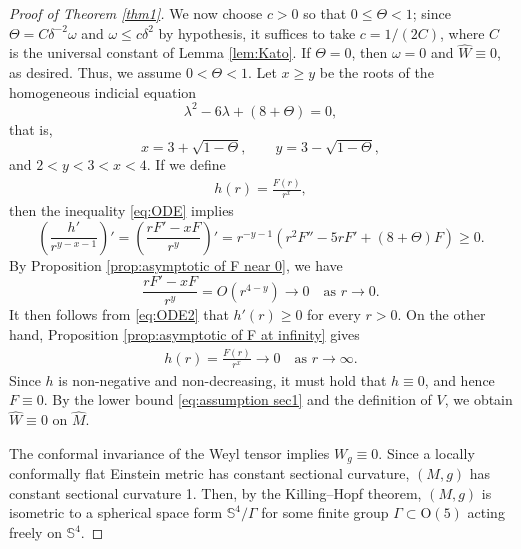\documentclass[11pt]{amsart}
\theoremstyle{plain}
\numberwithin{equation}{section}
\renewcommand{\S}{\mathbb{S}}
\newcommand{\wh}[1]{\widehat{#1}}
\newcommand{\hw}{\widehat{W}}
\newcommand{\hm}{\widehat{M}}
\begin{document}
\begin{proof}[Proof of Theorem \ref{thm1}]
We now choose $c>0$ so that $0\le \Theta<1$; since $\Theta=C\delta^{-2}\omega$ and $\omega \le c\delta^2$ by hypothesis, it suffices to take $c=1/(2C)$, where $C$ is the universal constant of Lemma \ref{lem:Kato}. If $\Theta=0$, then $\omega=0$ and $\wh{W}\equiv0$, as desired. Thus, we assume $0<\Theta<1$. Let $x\ge y$ be the roots of the homogeneous indicial equation
\begin{equation*}
\lambda^2-6\lambda+(8+\Theta)=0,
\end{equation*}
that is,
\begin{equation*}
x=3+\sqrt{1-\Theta},\qquad y=3-\sqrt{1-\Theta},
\end{equation*}
and $2<y<3<x<4$. If we define
\begin{align*}
h(r)=\frac{F(r)}{r^x},
\end{align*}
then the inequality \eqref{eq:ODE} implies
\begin{equation}\label{eq:ODE2}
\left(\frac{h'}{r^{y-x-1}}\right)'=\left(\frac{rF'-xF}{r^y}\right)'=r^{-y-1}(r^2F''-5rF'+(8+\Theta)F)\ge0.
\end{equation}
By Proposition \ref{prop:asymptotic of F near 0}, we have
\begin{equation*}
\frac{rF'-xF}{r^y}=O(r^{4-y})\rightarrow0\quad\text{as } r\rightarrow0.
\end{equation*}
It then follows from \eqref{eq:ODE2} that $h'(r)\ge0$ for every $r>0$. On the other hand, Proposition \ref{prop:asymptotic of F at infinity} gives 
\begin{align*}
h(r)=\frac{F(r)}{r^x}\rightarrow0\quad\text{as } r\rightarrow\infty. 
\end{align*}
Since $h$ is non-negative and non-decreasing, it must hold that $h\equiv 0$, and hence $F\equiv 0$. By the lower bound \eqref{eq:assumption sec1} and the definition of $V$, we obtain $\hw\equiv0$ on $\hm$.

The conformal invariance of the Weyl tensor implies $W_g\equiv 0$. Since a locally conformally flat Einstein metric has constant sectional curvature, $(M,g)$ has constant sectional curvature 1. Then, by the Killing--Hopf theorem, $(M,g)$ is isometric to a spherical space form $\S^4/\Gamma$ for some finite group $\Gamma\subset \mathrm{O}(5)$ acting freely on $\S^4$.


\end{proof}
\end{document}
